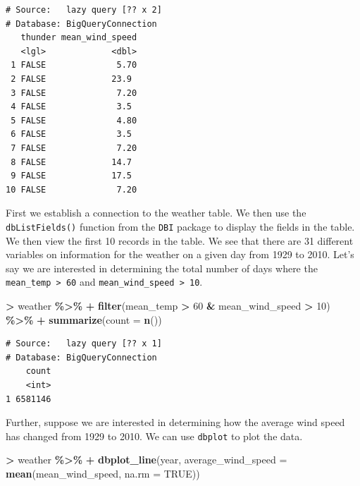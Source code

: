 \documentclass[
]{krantz}
\makeatletter
\newenvironment{Shaded}{\begin{snugshade}}{\end{snugshade}}
\newcommand{\DataTypeTok}[1]{\textcolor[rgb]{0.27,0.27,0.27}{#1}}
\newcommand{\DecValTok}[1]{\textcolor[rgb]{0.06,0.06,0.06}{#1}}
\newcommand{\KeywordTok}[1]{\textcolor[rgb]{0.27,0.27,0.27}{\textbf{#1}}}
\newcommand{\NormalTok}[1]{#1}
\newcommand{\OperatorTok}[1]{\textcolor[rgb]{0.43,0.43,0.43}{\textbf{#1}}}
\newcommand{\OtherTok}[1]{\textcolor[rgb]{0.37,0.37,0.37}{#1}}
\newcommand{\StringTok}[1]{\textcolor[rgb]{0.5,0.5,0.5}{#1}}
\newenvironment{kframe}{%
\medskip{}
\setlength{\fboxsep}{.8em}
 \def\at@end@of@kframe{}%
 \ifinner\ifhmode%
  \def\at@end@of@kframe{\end{minipage}}%
  \begin{minipage}{\columnwidth}%
 \fi\fi%
 \def\FrameCommand##1{\hskip\@totalleftmargin \hskip-\fboxsep
 \colorbox{shadecolor}{##1}\hskip-\fboxsep
     \hskip-\linewidth \hskip-\@totalleftmargin \hskip\columnwidth}%
 \MakeFramed {\advance\hsize-\width
   \@totalleftmargin\z@ \linewidth\hsize
   \@setminipage}}%
 {\par\unskip\endMakeFramed%
 \at@end@of@kframe}
\renewenvironment{Shaded}{\begin{kframe}}{\end{kframe}}
\makeatother
\begin{document}
\begin{verbatim}
# Source:   lazy query [?? x 2]
# Database: BigQueryConnection
   thunder mean_wind_speed
   <lgl>             <dbl>
 1 FALSE              5.70
 2 FALSE             23.9 
 3 FALSE              7.20
 4 FALSE              3.5 
 5 FALSE              4.80
 6 FALSE              3.5 
 7 FALSE              7.20
 8 FALSE             14.7 
 9 FALSE             17.5 
10 FALSE              7.20
\end{verbatim}

First we establish a connection to the weather table. We then use the \texttt{dbListFields()} function from the \texttt{DBI} package to display the fields in the table. We then view the first 10 records in the table. We see that there are 31 different variables on information for the weather on a given day from 1929 to 2010. Let's say we are interested in determining the total number of days where the \texttt{mean\_temp\ \textgreater{}\ 60} and \texttt{mean\_wind\_speed\ \textgreater{}\ 10}.

\begin{Shaded}
\begin{Highlighting}[]
\OperatorTok{\textgreater{}}\StringTok{ }\NormalTok{weather }\OperatorTok{\%\textgreater{}\%}
\OperatorTok{+}\StringTok{   }\KeywordTok{filter}\NormalTok{(mean\_temp }\OperatorTok{\textgreater{}}\StringTok{ }\DecValTok{60} \OperatorTok{\&}\StringTok{ }\NormalTok{mean\_wind\_speed }\OperatorTok{\textgreater{}}\StringTok{ }\DecValTok{10}\NormalTok{) }\OperatorTok{\%\textgreater{}\%}
\OperatorTok{+}\StringTok{   }\KeywordTok{summarize}\NormalTok{(}\DataTypeTok{count =} \KeywordTok{n}\NormalTok{())}
\end{Highlighting}
\end{Shaded}

\begin{verbatim}
# Source:   lazy query [?? x 1]
# Database: BigQueryConnection
    count
    <int>
1 6581146
\end{verbatim}

Further, suppose we are interested in determining how the average wind speed has changed from 1929 to 2010. We can use \texttt{dbplot} to plot the data.

\begin{Shaded}
\begin{Highlighting}[]
\OperatorTok{\textgreater{}}\StringTok{ }\NormalTok{weather }\OperatorTok{\%\textgreater{}\%}
\OperatorTok{+}\StringTok{   }\KeywordTok{dbplot\_line}\NormalTok{(year, }\DataTypeTok{average\_wind\_speed =} \KeywordTok{mean}\NormalTok{(mean\_wind\_speed, }\DataTypeTok{na.rm =} \OtherTok{TRUE}\NormalTok{))}
\end{Highlighting}
\end{Shaded}
\end{document}

